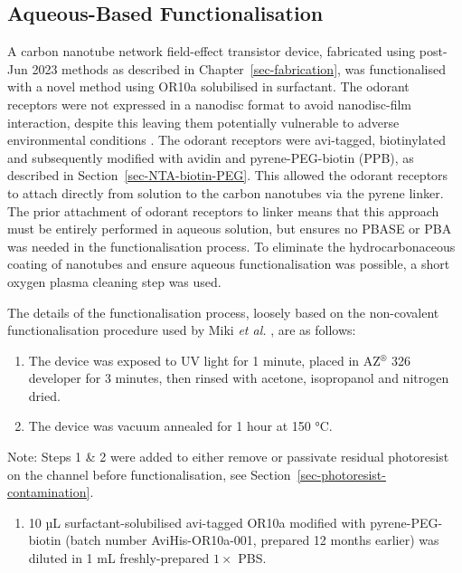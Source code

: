 \documentclass[
  a4paper,
]{scrbook}
\providecommand{\tightlist}{%
  \setlength{\itemsep}{0pt}\setlength{\parskip}{0pt}}\usepackage{longtable,booktabs,array}
\begin{document}
\hypertarget{sec-aqueous-functionalisation}{%
\subsection{Aqueous-Based
Functionalisation}\label{sec-aqueous-functionalisation}}

A carbon nanotube network field-effect transistor device, fabricated
using post-Jun 2023 methods as described in
Chapter~\ref{sec-fabrication}, was functionalised with a novel method
using OR10a solubilised in surfactant. The odorant receptors were not
expressed in a nanodisc format to avoid nanodisc-film interaction,
despite this leaving them potentially vulnerable to adverse
environmental conditions \autocite{Nath2007,Bayburt2010}. The odorant
receptors were avi-tagged, biotinylated and subsequently modified with
avidin and pyrene-PEG-biotin (PPB), as described in
Section~\ref{sec-NTA-biotin-PEG}. This allowed the odorant receptors to
attach directly from solution to the carbon nanotubes via the pyrene
linker. The prior attachment of odorant receptors to linker means that
this approach must be entirely performed in aqueous solution, but
ensures no PBASE or PBA was needed in the functionalisation process. To
eliminate the hydrocarbonaceous coating of nanotubes and ensure aqueous
functionalisation was possible, a short oxygen plasma cleaning step was
used.

The details of the functionalisation process, loosely based on the
non-covalent functionalisation procedure used by Miki \emph{et al.}
\autocite{Miki2019}, are as follows:

\begin{enumerate}
\def\labelenumi{\arabic{enumi}.}
\item
  The device was exposed to UV light for 1 minute, placed in
  AZ\(^\circledR\) 326 developer for 3 minutes, then rinsed with
  acetone, isopropanol and nitrogen dried.
\item
  The device was vacuum annealed for 1 hour at 150 °C.
\end{enumerate}

Note: Steps 1 \& 2 were added to either remove or passivate residual
photoresist on the channel before functionalisation, see
Section~\ref{sec-photoresist-contamination}.

\begin{enumerate}
\def\labelenumi{\arabic{enumi}.}
\setcounter{enumi}{2}
\tightlist
\item
  10 µL surfactant-solubilised avi-tagged OR10a modified with
  pyrene-PEG-biotin (batch number AviHis-OR10a-001, prepared 12 months
  earlier) was diluted in 1 mL freshly-prepared \(1 \times\) PBS.
\end{enumerate}
\end{document}
